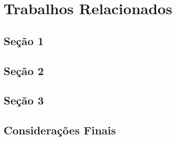 \chapter{Trabalhos Relacionados}

\lipsum

\section{Seção 1}

\lipsum

\section{Seção 2}

\lipsum

\section{Seção 3}

\lipsum

\section{Considerações Finais}

\lipsum